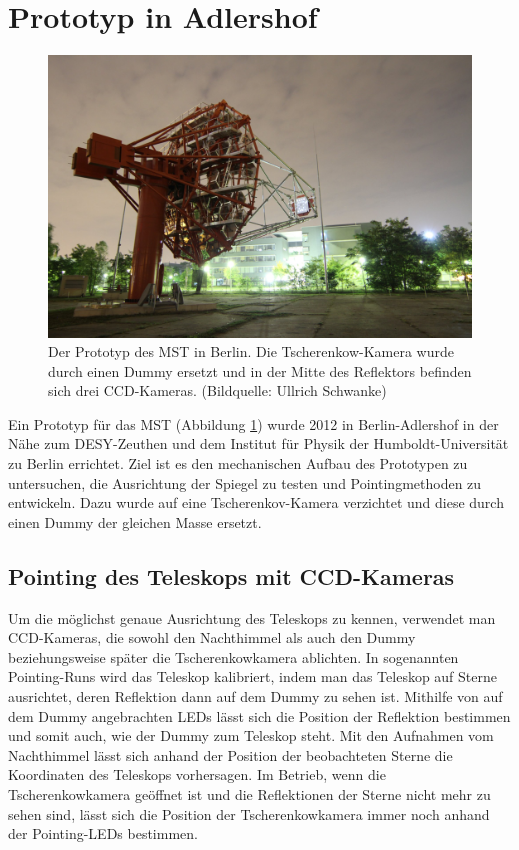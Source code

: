 \section{Prototyp in Adlershof}
\begin{figure}
\centering
\includegraphics[width=\textwidth]{Images/night.png}
\caption{Der Prototyp des MST in Berlin. Die Tscherenkow-Kamera wurde durch einen Dummy ersetzt und in der Mitte des Reflektors befinden sich drei CCD-Kameras. (Bildquelle: Ullrich Schwanke)}%
\label{img:mst}
\end{figure}
Ein Prototyp für das MST (Abbildung \ref{img:mst}) wurde 2012 in Berlin-Adlershof in der Nähe zum DESY-Zeuthen und dem Institut für Physik der Humboldt-Universität zu Berlin errichtet. Ziel ist es den mechanischen Aufbau des Prototypen zu untersuchen, die Ausrichtung der Spiegel zu testen und Pointingmethoden zu entwickeln. Dazu wurde auf eine Tscherenkov-Kamera verzichtet und diese durch einen Dummy der gleichen Masse ersetzt.

\subsection{Pointing des Teleskops mit CCD-Kameras}
Um die möglichst genaue Ausrichtung des Teleskops zu kennen, verwendet man CCD-Kameras, die sowohl den Nachthimmel als auch den Dummy beziehungsweise später die Tscherenkowkamera ablichten. In sogenannten Pointing-Runs wird das Teleskop kalibriert, indem man das Teleskop auf Sterne ausrichtet, deren Reflektion dann auf dem Dummy zu sehen ist. Mithilfe von auf dem Dummy angebrachten LEDs lässt sich die Position der Reflektion bestimmen und somit auch, wie der Dummy zum Teleskop steht. Mit den Aufnahmen vom Nachthimmel lässt sich anhand der Position der beobachteten Sterne die Koordinaten des Teleskops vorhersagen. Im Betrieb, wenn die Tscherenkowkamera geöffnet ist und die Reflektionen der Sterne nicht mehr zu sehen sind, lässt sich die Position der Tscherenkowkamera immer noch anhand der Pointing-LEDs bestimmen.

